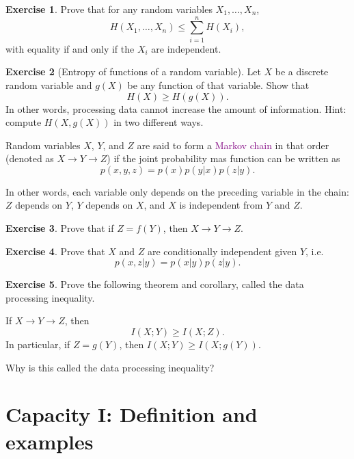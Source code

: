 \documentclass[a4paper, 11pt, openany]{book}
\numberwithin{equation}{section}
\theoremstyle{plain}
\theoremstyle{definition}
\newtheorem{exercise}   {Exercise}  [section]
\newcommand{\Define}[1]{\textcolor{purple}{#1}}
\begin{document}
\begin{exercise}
Prove that for any random variables $X_1,\ldots,X_n$,
$$
	H(X_1,\ldots,X_n) \le \sum_{i=1}^n H(X_i),
$$
with equality if and only if the $X_i$ are independent.
\end{exercise}



\begin{exercise}[Entropy of functions of a random variable] 
Let $X$ be a discrete random variable and $g(X)$ be any function of that variable. Show that
$$
	H(X) \ge H(g(X)).
$$
In other words, processing data cannot increase the amount of information.
Hint: compute $H(X,g(X))$ in two different ways.
\end{exercise}



Random variables $X$, $Y$, and $Z$ are said to form a \Define{Markov chain} in that order (denoted as $X \to Y \to Z$) if the joint probability mas function can be written as
$$
	p(x,y,z) = p(x) p(y|x) p(z | y).
$$

In other words, each variable only depends on the preceding variable in the chain: $Z$ depends on $Y$, $Y$ depends on $X$, and $X$ is independent from $Y$ and $Z$.

\begin{exercise}
Prove that if $Z = f(Y)$, then $X \to Y \to Z$.
\end{exercise}


\begin{exercise}
Prove that $X$ and $Z$ are conditionally independent given $Y$, i.e.
$$
	p(x,z|y) = p(x|y) p(z|y).
$$
\end{exercise}








\begin{exercise}
Prove the following theorem and corollary, called the data processing inequality.

If $X \to Y \to Z$, then
\[
	I(X;Y) \ge I(X;Z).
\]
In particular, if $Z = g(Y)$, then $I(X;Y) \ge I(X;g(Y))$.

Why is this called the data processing inequality?
\end{exercise}









\section{Capacity I: Definition and examples}
\label{sec:33}
\end{document}
